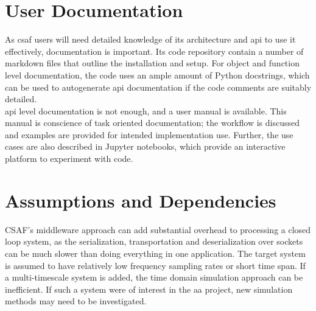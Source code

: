 \section{User Documentation}

As \acrshort{csaf} users will need detailed knowledge of its architecture and \acrshort{api} to use it effectively, documentation is important. Its code repository contain a number of markdown files that outline the installation and setup. For object and function level documentation, the code uses an ample amount of Python docstrings, which can be used to autogenerate \acrshort{api} documentation if the code comments are suitably detailed. \\

\acrshort{api} level documentation is not enough, and  a user manual is available. This manual is conscience of task oriented documentation; the workflow is discussed and examples are provided for intended implementation use. Further, the use cases are also described in Jupyter notebooks, which provide an interactive platform to experiment with code.

\section{Assumptions and Dependencies}

CSAF's middleware approach can add substantial overhead to processing a closed loop system, as the serialization, transportation and deserialization over sockets can be much slower than doing everything in one application. The target system is assumed to have relatively low frequency sampling rates or short time span. If a multi-timescale system is added, the time domain simulation approach can be inefficient. If such a system were of interest in the \acrshort{aa} project, new simulation methods may need to be investigated.\\
